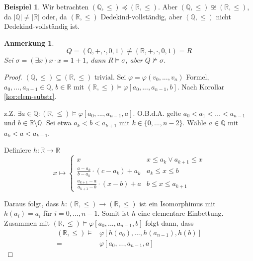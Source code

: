 \documentclass{article}
\theoremstyle{definition}
\newtheorem*{bsp}{Beispiel}
\theoremstyle{plain}
\newtheorem*{anm}{Anmerkung}
\begin{document}
    \begin{bsp}
        Wir betrachten $ (\mathbb{Q}, \leq) \preceq (\mathbb{R}, \leq) $.
        Aber $ (\mathbb{Q}, \leq) \not \cong (\mathbb{R}, \leq) $, da $ | \mathbb{Q} | \neq | \mathbb{R} | $ oder, da $ (\mathbb{R}, \leq) $ Dedekind-vollständig, aber $ (\mathbb{Q}, \leq) $ nicht Dedekind-vollständig ist.

        \begin{anm}
            \begin{equation*}
                Q = (\mathbb{Q}, +, \cdot, 0, 1) \not \equiv (\mathbb{R}, +, \cdot, 0, 1) = R
            \end{equation*}
            Sei $ \sigma = (\exists x) x \cdot x = 1 + 1 $, dann $ R \models \sigma $, aber $ Q \not \models \sigma $.
        \end{anm}

        \begin{proof}
            $ (\mathbb{Q}, \leq) \subseteq (\mathbb{R}, \leq) $ trivial.
            Sei $ \varphi = \varphi(v_0, ..., v_n) $ Formel, $ a_0, ..., a_{n - 1} \in \mathbb{Q} $, $ b \in \mathbb{R} $ mit $ (\mathbb{R}, \leq) \models \varphi[a_0, ..., a_{n - 1}, b] $.
            Nach Korollar \ref{kor:elem-substr}.

            z.Z. $ \exists a \in \mathbb{Q}: (\mathbb{R}, \leq) \models \varphi[a_0, ..., a_{n - 1}, a] $.
            O.B.d.A. gelte $ a_0 < a_1 < ... < a_{n - 1} $ und $ b \in \mathbb{R} \setminus \mathbb{Q} $.
            Sei etwa $ a_k < b < a_{k+1} $ mit $ k \in \{0, ..., n - 2\} $.
            Wähle $ a \in \mathbb{Q} $ mit $ a_k < a < a_{k + 1 } $.

            Definiere $ h: \mathbb{R} \rightarrow \mathbb{R} $
            \begin{equation*}
                x \mapsto \begin{cases}
                    x & x \leq a_k \lor a_{k + 1} \leq x \\
                    \frac{a - a_k}{b - a_k} \cdot (c - a_k) + a_k & a_k \leq x \leq b \\
                    \frac{a_{k + 1} - a}{a_{k + 1} - b} \cdot (x - b) + a & b \leq x \leq a_{k + 1}
                \end{cases}
            \end{equation*}

            Daraus folgt, dass $ h: (\mathbb{R}, \leq) \rightarrow (\mathbb{R}, \leq) $ ist ein Isomorphimus mit $ h(a_i) = a_i $ für $ i = 0, ..., n - 1 $.
            Somit ist $ h $ eine elementare Einbettung.
            Zusammen mit $ (\mathbb{R}, \leq) \models \varphi[a_0, ..., a_{n - 1}, b] $ folgt dann, dass
            \begin{align*}
                (\mathbb{R}, \leq) \models & \varphi[h(a_0), ..., h(a_{n - 1}), h(b)] \\
                = & \varphi[a_0, ..., a_{n - 1}, a]
            \end{align*}
        \end{proof}
    \end{bsp}
\end{document}
